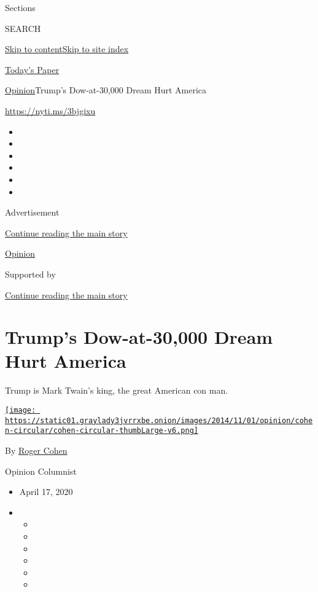 Sections

SEARCH

\protect\hyperlink{site-content}{Skip to
content}\protect\hyperlink{site-index}{Skip to site index}

\href{https://myaccount.nytimes3xbfgragh.onion/auth/login?response_type=cookie\&client_id=vi}{}

\href{https://www.nytimes3xbfgragh.onion/section/todayspaper}{Today's
Paper}

\href{/section/opinion}{Opinion}\textbar{}Trump's Dow-at-30,000 Dream
Hurt America

\url{https://nyti.ms/3bjgixu}

\begin{itemize}
\item
\item
\item
\item
\item
\item
\end{itemize}

Advertisement

\protect\hyperlink{after-top}{Continue reading the main story}

\href{/section/opinion}{Opinion}

Supported by

\protect\hyperlink{after-sponsor}{Continue reading the main story}

\hypertarget{trumps-dow-at-30000-dream-hurt-america}{%
\section{Trump's Dow-at-30,000 Dream Hurt
America}\label{trumps-dow-at-30000-dream-hurt-america}}

Trump is Mark Twain's king, the great American con man.

\href{https://www.nytimes3xbfgragh.onion/by/roger-cohen}{\texttt{[image: https://static01.graylady3jvrrxbe.onion/images/2014/11/01/opinion/cohen-circular/cohen-circular-thumbLarge-v6.png]}}

By \href{https://www.nytimes3xbfgragh.onion/by/roger-cohen}{Roger Cohen}

Opinion Columnist

\begin{itemize}
\item
  April 17, 2020
\item
  \begin{itemize}
  \item
  \item
  \item
  \item
  \item
  \item
  \end{itemize}
\end{itemize}

